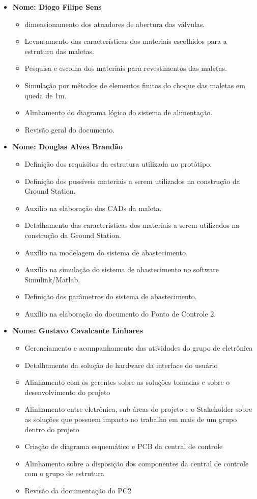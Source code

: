 \begin{itemize}
    \item \textbf{Nome: Diogo Filipe Sens}
    \begin{itemize}
     \item dimensionamento dos atuadores de abertura das válvulas.
     \item Levantamento das características dos materiais escolhidos para a estrutura das maletas.
     \item Pesquisa e escolha dos materiais para revestimentos das maletas.
     \item Simulação por métodos de elementos finitos do choque das maletas em queda de 1m.
     \item Alinhamento do diagrama lógico do sistema de alimentação.
     \item Revisão geral do documento.
    \end{itemize}

    
    \item \textbf{Nome: Douglas Alves Brandão}
    \begin{itemize}
         \item Definição dos requisitos da estrutura utilizada no protótipo.
         \item Definição dos possíveis materiais a serem utilizados na construção da Ground Station.
         \item Auxílio na elaboração dos CADs da maleta. 
         \item Detalhamento das características dos materiais a serem utilizados na construção da Ground Station.
         \item Auxílio na modelagem do sistema de abastecimento. 
         \item Auxílio na simulação do sistema de abastecimento no software Simulink/Matlab.
         \item Definição dos parâmetros do sistema de abastecimento.
         \item Auxílio na elaboração do documento do Ponto de Controle 2.
    \end{itemize}


    \item \textbf{Nome: Gustavo Cavalcante Linhares}
    \begin{itemize}
         \item Gerenciamento e acompanhamento das atividades do grupo de eletrônica 
         \item Detalhamento da solução de hardware da interface do usuário 
         \item Alinhamento com os gerentes sobre as soluções tomadas e sobre o desenvolvimento do projeto
         \item Alinhamento entre eletrônica, sub áreas do projeto e o Stakeholder sobre as soluções que possuem impacto no trabalho em mais de um grupo dentro do projeto
         \item Criação de diagrama esquemático e PCB da central de controle 
         \item Alinhamento sobre a disposição dos componentes da central de controle com o grupo de estrutura
         \item Revisão da documentação do PC2
    \end{itemize}
    

\end{itemize}
